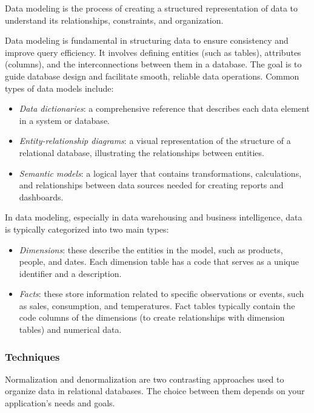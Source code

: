 \begin{definition}
    Data modeling is the process of creating a structured representation of data to understand its relationships, constraints, and organization.
\end{definition}
\noindent Data modeling is fundamental in structuring data to ensure consistency and improve query efficiency. 
It involves defining entities (such as tables), attributes (columns), and the interconnections between them in a database. 
The goal is to guide database design and facilitate smooth, reliable data operations. 
Common types of data models include:
\begin{itemize}
    \item \textit{Data dictionaries}: a comprehensive reference that describes each data element in a system or database.
    \item \textit{Entity-relationship diagrams}: a visual representation of the structure of a relational database, illustrating the relationships between entities.
    \item \textit{Semantic models}: a logical layer that contains transformations, calculations, and relationships between data sources needed for creating reports and dashboards.
\end{itemize}
\noindent In data modeling, especially in data warehousing and business intelligence, data is typically categorized into two main types:
\begin{itemize}
    \item \textit{Dimensions}: these describe the entities in the model, such as products, people, and dates. 
        Each dimension table has a code that serves as a unique identifier and a description.
    \item \textit{Facts}: these store information related to specific observations or events, such as sales, consumption, and temperatures. 
        Fact tables typically contain the code columns of the dimensions (to create relationships with dimension tables) and numerical data.
\end{itemize}

\subsubsection{Techniques}
Normalization and denormalization are two contrasting approaches used to organize data in relational databases. 
The choice between them depends on your application's needs and goals.

